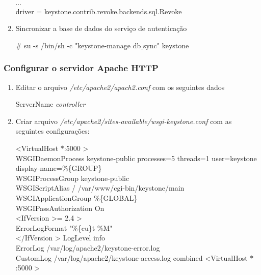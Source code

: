 \begin{enumerate}
\begin{snugshade}
			[revoke] \\
			$\cdots$ \\ 
			driver = keystone.contrib.revoke.backends.sql.Revoke
		\end{snugshade}	
		
		\item Sincronizar a base de dados do serviço de autenticação
		\begin{snugshade}
			\# su -s /bin/sh -c "keystone-manage db$\_$sync" keystone
		\end{snugshade}
	\end{enumerate}
	
	\subsubsection{Configurar o servidor Apache HTTP}
		\begin{enumerate}
			\item Editar o arquivo \emph{/etc/apache2/apach2.conf} com os seguintes dados
			\begin{snugshade}
				ServerName \emph{controller}
			\end{snugshade}
			
			\item Criar arquivo \emph{/etc/apache2/sites-available/wsgi-keystone.conf} com as seguintes configurações:
			\begin{snugshade}
				\textless VirtualHost $\ast$:5000 \textgreater\\ 
				\hspace*{2 cm}WSGIDaemonProcess keystone-public processes=5 threads=1 user=keystone display-name=$\%$\{GROUP\} \\
				\hspace*{2 cm} WSGIProcessGroup keystone-public \\
				\hspace*{2 cm} WSGIScriptAlias / /var/www/cgi-bin/keystone/main\\
				\hspace*{2 cm} WSGIApplicationGroup $\%$\{GLOBAL\} \\
				\hspace*{2 cm} WSGIPassAuthorization On \\
				\hspace*{2 cm} \textless IfVersion \textgreater = 2.4 \textgreater \\
				\hspace*{3 cm}	ErrorLogFormat "$\%$\{cu\}t \%M" \\
				\hspace*{2 cm} \textless /IfVersion \textgreater
				\hspace*{2 cm} LogLevel info \\
				\hspace*{2 cm} ErrorLog /var/log/apache2/keystone-error.log \\
				\hspace*{2 cm} CustomLog /var/log/apache2/keystone-access.log combined
       			\textless VirtualHost $\ast$:5000 \textgreater \\ \\
       			

\end{snugshade}
\end{enumerate}
